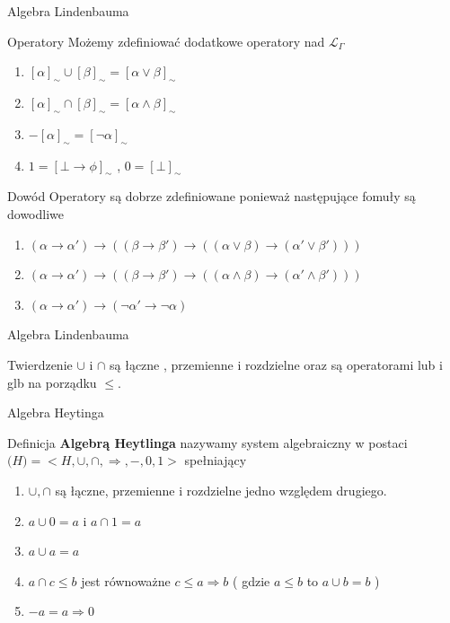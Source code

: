 \documentclass{beamer}
\begin{document}
\begin{frame}{Algebra Lindenbauma }
 \begin{block}{Operatory}
 Możemy zdefiniować dodatkowe operatory nad \( \mathcal{L}_{\Gamma} \)
 \begin{enumerate}
 \item \([\alpha]_{\sim} \cup [\beta]_{\sim} = [ \alpha \vee \beta ]_{\sim}\)
 \item \([\alpha]_{\sim} \cap [\beta]_{\sim} = [ \alpha \wedge \beta ]_{\sim}\)
  \item \(-[\alpha]_{\sim} = [\neg \alpha ]_{\sim}\)
  \item \( 1 = [\bot \rightarrow \phi ]_{\sim} \) , \( 0 = [\bot]_{\sim} \)
 \end{enumerate}
 \end{block}
 
  \begin{block}{Dowód}
 Operatory są dobrze zdefiniowane ponieważ następujące fomuły są dowodliwe
 \begin{enumerate}
 \item \((\alpha \rightarrow \alpha') \rightarrow 
 (
 	(\beta \rightarrow \beta') \rightarrow
 	(( \alpha \vee \beta) \rightarrow (\alpha' \vee \beta')))\)
  \item \((\alpha \rightarrow \alpha') \rightarrow 
 (
 	(\beta \rightarrow \beta') \rightarrow
 	(( \alpha \wedge \beta) \rightarrow (\alpha' \wedge \beta')))\)
  \item \((\alpha \rightarrow \alpha') \rightarrow 
(\neg \alpha' \rightarrow \neg \alpha)\)
 \end{enumerate}
 \end{block}
 
\end{frame}

\begin{frame}{Algebra Lindenbauma }
 \begin{block}{Twierdzenie}
 \( \cup \) i \(\cap \) są łączne , przemienne i rozdzielne oraz są operatorami lub i glb na porządku \( \leq \).
 \end{block}
 
\end{frame}

\begin{frame}{Algebra Heytinga}
 \begin{block}{Definicja}
\textbf{Algebrą Heytlinga} nazywamy system algebraiczny w postaci \( \mathcal(H) = < H, \cup, \cap, \Rightarrow, - , 0 ,1 > \) spełniający 
\begin{enumerate}
	\item \(\cup, \cap\) są łączne, przemienne i rozdzielne jedno względem drugiego.
 \item \( a \cup 0 = a \) i \( a \cap 1 = a \) 
 \item \( a \cup a  = a \) 
 \item \( a \cap c \leq b \) jest równoważne \( c \leq a \Rightarrow b \) ( gdzie \( a \leq b \) to \( a \cup b  = b\) )
 \item \( -a  = a \Rightarrow 0 \)
\end{enumerate}
 \end{block}
\end{frame}
 
\end{document}
